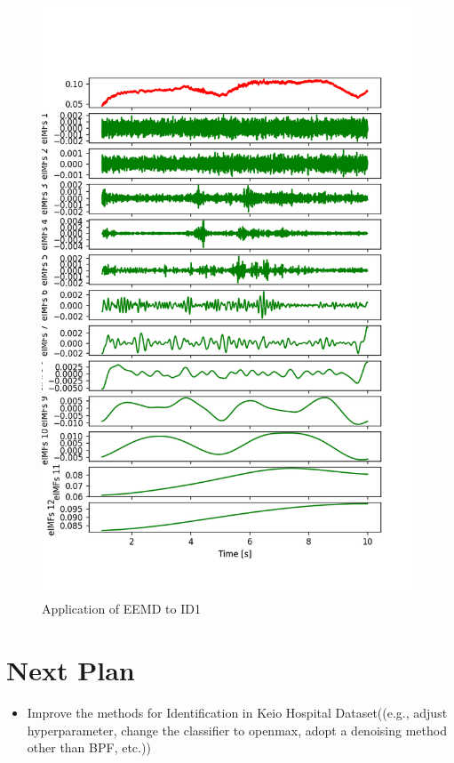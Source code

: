 \documentclass[dvipdfmx]{article}
\begin{document}
\begin{figure}[H]
\begin{center}
\includegraphics[width=0.9\linewidth]{./img/eemd_example.png}
\end{center}
\caption{Application of EEMD to ID1}
\end{figure}

\section{Next Plan}
\begin{itemize}
    \item Improve the methods for Identification in Keio Hospital Dataset((e.g., adjust hyperparameter, change the classifier to openmax, adopt a denoising method other than BPF, etc.))
\end{itemize}
\end{document}
